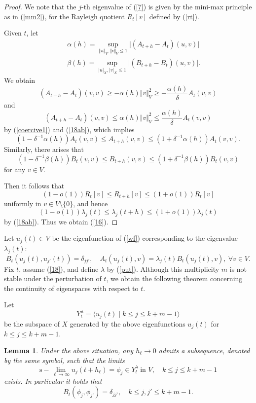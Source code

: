\documentclass[final,a4paper]{jmsj}
\theoremstyle{thmstyleone}%
\theoremstyle{thmstyletwo}%
\theoremstyle{thmstylethree}%
\newtheorem{lemma}[theorem]{Lemma}
\begin{document}
\begin{proof}
We note that the $j$-th eigenvalue of (\ref{7}) is given by the mini-max principle as in (\ref{mm2}), for the Rayleigh quotient $R_t[v]$ defined by (\ref{rt}). 



Given $t$, let  
\begin{eqnarray} 
& & \alpha(h)=\sup_{\Vert u\Vert_V, \Vert v\Vert_V\leq 1}\vert (A_{t+h}-A_{t})(u,v)\vert \nonumber\\ 
& & \beta(h)=\sup_{\vert u\vert_X, \vert v\vert_X\leq 1}\vert (B_{t+h}-B_{t})(u,v)\vert. 
 \label{alphabeta}
\end{eqnarray}
We obtain  
\[ (A_{t+h}-A_{t})(v, v)\geq -\alpha(h)\Vert v\Vert_V^2\geq -\frac{\alpha(h)}{\delta}A_{t}(v,v) \] 
and 
\[ (A_{t+h}-A_{t})(v,v)\leq \alpha(h)\Vert v\Vert_V^2\leq \frac{\alpha(h)}{\delta}A_{t}(v,v) \] 
by (\ref{coercive1}) and (\ref{18ab}), 
which implies    
\[ (1-\delta^{-1}\alpha(h))A_{t}(v,v)\leq A_{t+h}(v,v)\leq (1+\delta^{-1}\alpha(h))A_{t}(v,v). \] 
Similarly, there arises that 
\[ (1-\delta^{-1}\beta(h))B_{t}(v,v)\leq B_{t+h}(v,v)\leq (1+\delta^{-1}\beta(h))B_{t}(v,v) \] 
for any $v\in V$. 

Then it follows that   
\[ (1-o(1))R_{t}[v]\leq R_{t+h}[v]\leq (1+o(1))R_{t}[v] \] 
uniformly in $v\in V\setminus \{0\}$, and hence 
\[ (1-o(1))\lambda_j(t)\leq \lambda_j(t+h)\leq (1+o(1))\lambda_j(t) \] 
by (\ref{18ab}). Thus we obtain (\ref{16}). 
\end{proof} 



Let $u_j(t)\in V$ be the eigenfunction of  (\ref{wf}) corresponding to the eigenvalue $\lambda_j(t)$:  
\begin{equation} 
B_t(u_j(t), u_{j'}(t))=\delta_{jj'}, \quad A_t(u_j(t), v)=\lambda_j(t)B_t(u_j(t),v), \ \forall v\in V.
 \label{19}
\end{equation} 
Fix $t$, assume (\ref{18}), and define $\lambda$ by (\ref{put}). Although this multiplicity $m$ is not stable under the perturbation of $t$, we obtain the following theorem concerning the continuity of eigenspaces with respect to $t$.  

Let 
\begin{equation} 
Y_t^\lambda=\langle u_j(t) \mid k\leq j\leq k+m-1 \rangle 
 \label{ym}
\end{equation} 
be the subspace of $X$ generated by the above eigenfunctions $u_j(t)$ for $k\leq j\leq k+m-1$. 


\begin{lemma}\label{thm3}
Under the above situation, any $h_\ell\rightarrow 0$ admits a subsequence, denoted by the same symbol, such that the limits  
\begin{equation} 
\mbox{s}-\lim_{\ell\rightarrow \infty}u_j(t+h_\ell)=\phi_j\in Y_t^\lambda \ \mbox{in $V$}, \quad  k\leq j\leq k+m-1 
 \label{strong}
\end{equation} 
exists. In particular it holds that  
\begin{equation}  
B_{t}(\phi_j, \phi_{j'})=\delta_{jj'}, \quad k\leq j, j'\leq k+m-1. 
 \label{bb}
\end{equation} 
\end{lemma} 
\end{document}
